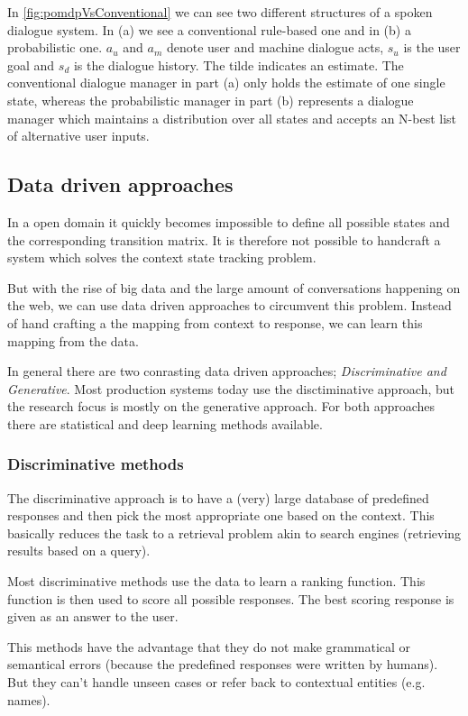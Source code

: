 \documentclass[conference]{IEEEtran}
\begin{document}
In \autoref{fig:pomdpVsConventional} we can see two different structures of a spoken dialogue system. In (a) we see a conventional rule-based one and in (b) a probabilistic one. $a_{u}$ and $a_{m}$ denote user and machine dialogue acts, $s_{u}$ is the user goal and $s_{d}$ is the dialogue history. The tilde indicates an estimate.
The conventional dialogue manager in part (a) only holds the estimate of one single state, whereas the probabilistic manager in part (b) represents a dialogue manager which maintains a distribution over all states and accepts an N-best list of alternative user inputs\cite{young2010hidden}.  

\subsection{Data driven approaches}
In a open domain it quickly becomes impossible to define all possible states and the corresponding transition matrix. It is therefore not possible to handcraft a system which solves the context state tracking problem\cite{radlinski2017theoretical}.

But with the rise of big data and the large amount of conversations happening on the web, we can use data driven approaches to circumvent this problem. Instead of hand crafting a the mapping from context to response, we can learn this mapping from the data.

In general there are two conrasting data driven approaches; \emph{Discriminative and Generative}. Most production systems today use the disctiminative approach, but the research focus is mostly on the generative approach. For both approaches there are statistical and deep learning methods available\cite{yan2016shall}.

\subsubsection{Discriminative methods}
The discriminative approach is to have a (very) large database of predefined responses and then pick the most appropriate one based on the context. This basically reduces the task to a retrieval problem akin to search engines (retrieving results based on a query).

Most discriminative methods use the data to learn a ranking function. This function is then used to score all possible responses. The best scoring response is given as an answer to the user.\cite{yan2016shall}

This methods have the advantage that they do not make grammatical or semantical errors (because the predefined responses were written by humans). But they can't handle unseen cases or refer back to contextual entities (e.g. names).
\end{document}
